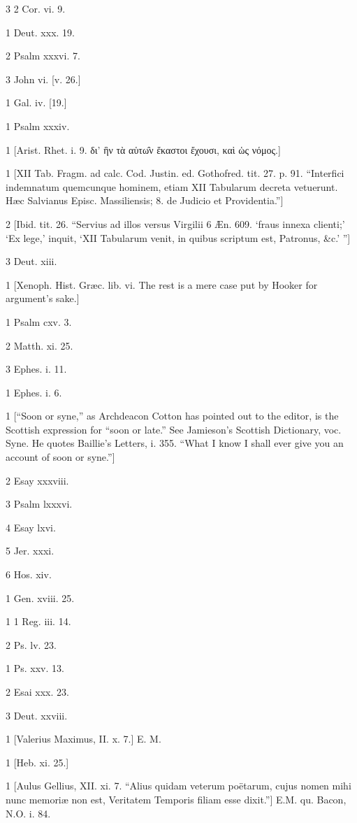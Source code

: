 3
2 Cor. vi. 9.

1
Deut. xxx. 19.

2
Psalm xxxvi. 7.

3
John vi. [v. 26.]

1
Gal. iv. [19.]

1
Psalm xxxiv.

1
[Arist. Rhet. i. 9. δι’ ἣν τὰ αὑτω̑ν ἕκαστοι ἔχουσι, καὶ ὡς νόμος.]

1
[XII Tab. Fragm. ad calc. Cod. Justin. ed. Gothofred. tit. 27. p. 91. “Interfici indemnatum quemcunque hominem, etiam XII Tabularum decreta vetuerunt. Hæc Salvianus Episc. Massiliensis; 8. de Judicio et Providentia.”]

2
[Ibid. tit. 26. “Servius ad illos versus Virgilii 6 Æn. 609. ‘fraus innexa clienti;’ ‘Ex lege,’ inquit, ‘XII Tabularum venit, in quibus scriptum est, Patronus, &c.’ ”]

3
Deut. xiii.

1
[Xenoph. Hist. Græc. lib. vi. The rest is a mere case put by Hooker for argument’s sake.]

1
Psalm cxv. 3.

2
Matth. xi. 25.

3
Ephes. i. 11.

1
Ephes. i. 6.

1
[“Soon or syne,” as Archdeacon Cotton has pointed out to the editor, is the Scottish expression for “soon or late.” See Jamieson’s Scottish Dictionary, voc. Syne. He quotes Baillie’s Letters, i. 355. “What I know I shall ever give you an account of soon or syne.”]

2
Esay xxxviii.

3
Psalm lxxxvi.

4
Esay lxvi.

5
Jer. xxxi.

6
Hos. xiv.

1
Gen. xviii. 25.

1
1 Reg. iii. 14.

2
Ps. lv. 23.

1
Ps. xxv. 13.

2
Esai xxx. 23.

3
Deut. xxviii.

1
[Valerius Maximus, II. x. 7.] E. M.

1
[Heb. xi. 25.]

1
[Aulus Gellius, XII. xi. 7. “Alius quidam veterum poëtarum, cujus nomen mihi nunc memoriæ non est, Veritatem Temporis filiam esse dixit.”] E.M. qu. Bacon, N.O. i. 84.

